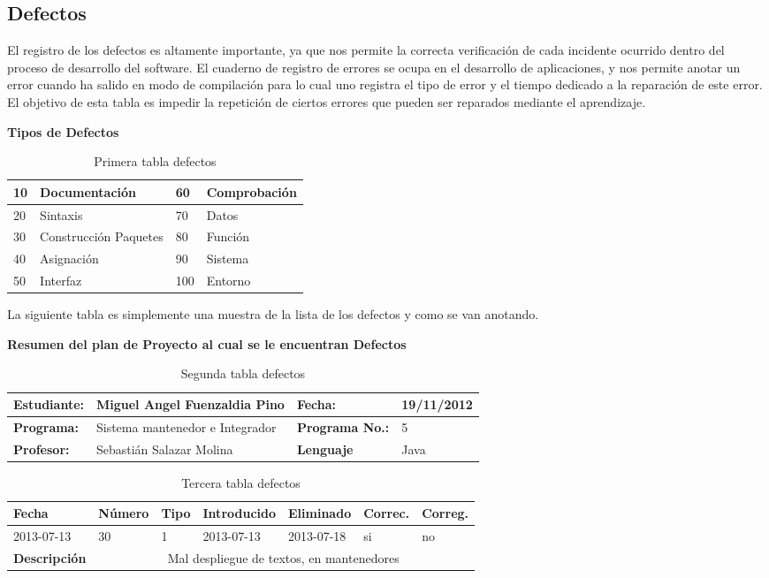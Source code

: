 \documentclass[a4paper,12pt,openany,oneside]{book}
\begin{document}
\subsection{Defectos}
El registro de los defectos es altamente importante, ya que nos permite la correcta verificación de cada incidente ocurrido dentro del proceso de desarrollo del software. El cuaderno de registro de errores se ocupa en el desarrollo de aplicaciones, y nos permite anotar un error cuando ha salido en modo de compilación para lo cual uno registra el tipo de error y el tiempo dedicado a la reparación de este error. El objetivo de esta tabla es impedir la repetición de ciertos errores que pueden ser reparados mediante el aprendizaje.\\
\begin{table}
\textbf{Tipos de Defectos}\\
\begin{tabular}{| l | l | l | l |}
\hline
10 & Documentación         & 60 & Comprobación\\
\hline
20 & Sintaxis              & 70 & Datos\\
\hline
30 & Construcción Paquetes & 80 & Función\\
\hline
40 & Asignación            & 90 & Sistema\\
\hline
50 & Interfaz              & 100 & Entorno\\
\hline
\end{tabular}
\caption{Primera tabla defectos}
\end{table}

La siguiente tabla es simplemente una muestra de la lista de los defectos y como se van anotando.
\begin{table}
\textbf{Resumen del plan de Proyecto al cual se le encuentran Defectos}\\
\begin{tabular}{| l | l | l | l |}
\hline
\textbf{Estudiante:} & Miguel Angel Fuenzaldia Pino & \textbf{Fecha:} & 19/11/2012\\
\hline
\textbf{Programa:} & Sistema mantenedor e Integrador & \textbf{Programa No.:} & 5\\
\hline
\textbf{Profesor:} & Sebastián Salazar Molina & \textbf{Lenguaje} & Java  \\
\hline
\end{tabular}
\caption{Segunda tabla defectos}
\end{table}
\begin{table}
\begin{tabular}{| l | l | l | l | l | l | l |}
\hline
\textbf{Fecha} & \textbf{Número} & \textbf{Tipo} & \textbf{Introducido} & \textbf{Eliminado} & \textbf{Correc.} & \textbf{Correg.}\\
\hline
2013-07-13 & 30 & 1 & 2013-07-13 & 2013-07-18 & si & no \\
\hline
\textbf{Descripción} & \multicolumn{6}{|c|}{Mal despliegue de textos, en mantenedores} \\
\hline
\end{tabular}
\caption{Tercera tabla defectos}
\end{table}
\end{document}
